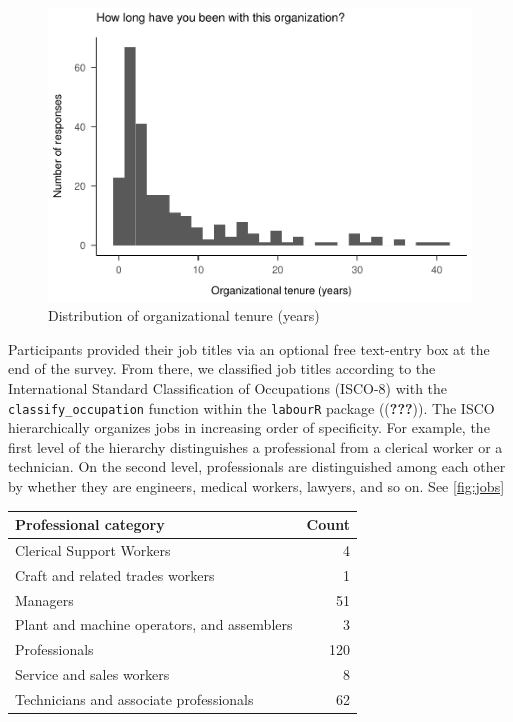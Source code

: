 \documentclass[
  english,
  man]{apa6}
\begin{document}
\begin{figure}
\centering
\includegraphics{SIOPpapaja_files/figure-latex/tenure-1.pdf}
\caption{\label{fig:tenure}Distribution of organizational tenure (years)}
\end{figure}

Participants provided their job titles via an optional free text-entry box at the end of the survey. From there, we classified job titles according to the International Standard Classification of Occupations (ISCO-8) with the \texttt{classify\_occupation} function within the \texttt{labourR} package (({\textbf{???}})). The ISCO hierarchically organizes jobs in increasing order of specificity. For example, the first level of the hierarchy distinguishes a professional from a clerical worker or a technician. On the second level, professionals are distinguished among each other by whether they are engineers, medical workers, lawyers, and so on. See \ref{fig:jobs}

\begin{tabular}{l|r}
\hline
Professional category & Count\\
\hline
Clerical Support Workers & 4\\
\hline
Craft and related trades workers & 1\\
\hline
Managers & 51\\
\hline
Plant and machine operators, and assemblers & 3\\
\hline
Professionals & 120\\
\hline
Service and sales workers & 8\\
\hline
Technicians and associate professionals & 62\\
\hline
\end{tabular}
\end{document}
